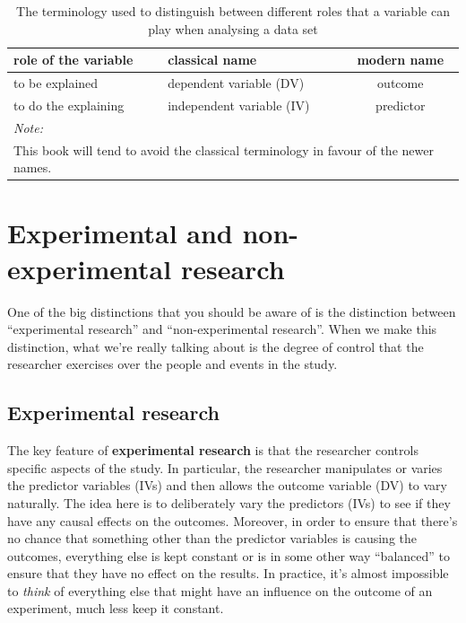 \documentclass[
]{book}
\theoremstyle{definition}
\theoremstyle{definition}
\theoremstyle{definition}
\theoremstyle{definition}
\theoremstyle{remark}
\begin{document}
\begin{table}[H]

\caption{\label{tab:ivdv}The terminology used to distinguish between 
      different roles that a variable can play when analysing a data set}
\centering
\begin{tabular}[t]{llc}
\toprule
role of the variable & classical name & modern name\\
\midrule
to be explained & dependent variable (DV) & outcome\\
to do the explaining & independent variable (IV) & predictor\\
\bottomrule
\multicolumn{3}{l}{\rule{0pt}{1em}\textit{Note: }}\\
\multicolumn{3}{l}{\rule{0pt}{1em}This book will tend to avoid the classical terminology in favour of the newer names.}\\
\end{tabular}
\end{table}

\hypertarget{researchdesigns}{%
\section{Experimental and non-experimental research}\label{researchdesigns}}

One of the big distinctions that you should be aware of is the distinction between ``experimental research'' and ``non-experimental research''. When we make this distinction, what we're really talking about is the degree of control that the researcher exercises over the people and events in the study.

\hypertarget{experimental-research}{%
\subsection{Experimental research}\label{experimental-research}}

The key feature of \textbf{experimental research} is that the researcher controls specific aspects of the study. In particular, the researcher manipulates or varies the predictor variables (IVs) and then allows the outcome variable (DV) to vary naturally. The idea here is to deliberately vary the predictors (IVs) to see if they have any causal effects on the outcomes. Moreover, in order to ensure that there's no chance that something other than the predictor variables is causing the outcomes, everything else is kept constant or is in some other way ``balanced'' to ensure that they have no effect on the results. In practice, it's almost impossible to \emph{think} of everything else that might have an influence on the outcome of an experiment, much less keep it constant.
\end{document}
